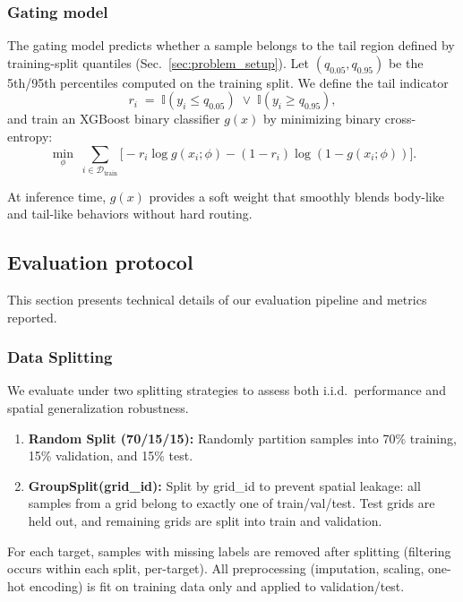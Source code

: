 \documentclass[pdflatex,sn-basic,Numbered]{sn-jnl}
\begin{document}
\subsubsection{Gating model}
The gating model predicts whether a sample belongs to the tail region defined by training-split quantiles (Sec.~\ref{sec:problem_setup}). Let $(q_{0.05},q_{0.95})$ be the 5th/95th percentiles computed on the training split. We define the tail indicator
\begin{equation}
    r_i \;=\; \mathbb{I}\!\left(y_i \le q_{0.05}\right)\;\lor\;\mathbb{I}\!\left(y_i \ge q_{0.95}\right),
\end{equation}
and train an XGBoost binary classifier $g(x)$ by minimizing binary cross-entropy:
\begin{equation}
    \min_{\phi}\;\sum_{i\in\mathcal{D}_{\mathrm{train}}}
    \Big[-r_i\log g(x_i;\phi) - (1-r_i)\log(1-g(x_i;\phi))\Big].
\end{equation}

At inference time, $g(x)$ provides a soft weight that smoothly blends body-like and tail-like behaviors without hard routing.

\subsection{Evaluation protocol}

This section presents technical details of our evaluation pipeline and metrics reported.

\label{sec:eval_protocol}

\subsubsection{Data Splitting}
\label{sec:data_splitting}

We evaluate under two splitting strategies to assess both i.i.d.\ performance and spatial generalization robustness.
\begin{enumerate}
    \item \textbf{Random Split (70/15/15):} Randomly partition samples into 70\% training, 15\% validation, and 15\% test.
    \item \textbf{GroupSplit(grid\_id):} Split by grid\_id to prevent spatial leakage: all samples from a grid belong to exactly one of train/val/test. Test grids are held out, and remaining grids are split into train and validation.
\end{enumerate}

\textbf{} For each target, samples with missing labels are removed after splitting (filtering occurs within each split, per-target). All preprocessing (imputation, scaling, one-hot encoding) is fit on training data only and applied to validation/test.
\end{document}
